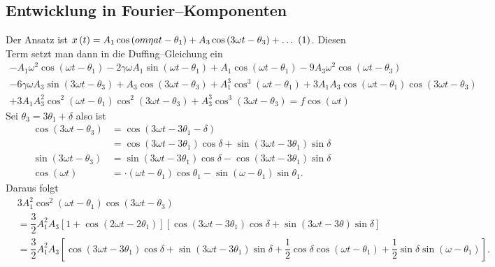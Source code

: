 \documentclass[a4paper,12pt]{article}
\newcommand\inlineeqno{\stepcounter{equation}\ {(\theequation)}}
\numberwithin{equation}{section}
\begin{document}
\subsection{Entwicklung in Fourier--Komponenten}
Der Ansatz ist $x\left(t\right)=A_1\cos \left(om\eta at-\theta _1\right)+A_3\cos \left(3\omega t-\theta _3\right)+\hdots \inlineeqno\label{eq:9.54}$. Diesen Term setzt man dann in die Duffing--Gleichung ein
\begin{multline*}
        -A_1\omega ^2\cos \left(\omega t-\theta _1\right)-2\gamma \omega A_1\sin \left(\omega t-\theta _1\right)+A_1\cos \left(\omega t-\theta _1\right)-9A_3\omega ^2\cos \left(\omega t-\theta _3\right)\\
        -6\gamma \omega A_3\sin \left(3\omega t-\theta _3\right)+A_3\cos \left(3\omega t-\theta _3\right)+A_1^3\cos ^3\left(\omega t-\theta _1\right)+3A_1A_3\cos \left(\omega t-\theta _1\right)\cos \left(3\omega t-\theta _3\right)\\
        +3A_1A_3^2\cos ^2\left(\omega t-\theta _1\right)\cos ^2\left(3\omega t-\theta _3\right)+A_3^3\cos ^3\left(3\omega t-\theta _3\right)=f\cos \left(\omega t\right)
\end{multline*}
Sei $\theta _3=3\theta _1+\delta $ also ist
\begin{align*} 
        \cos \left(3\omega t-\theta _3\right)&=\cos \left(3\omega t-3\theta _1-\delta \right)\\
                                             &=\cos \left(3\omega t-3\theta _1\right)\cos \delta +\sin \left(3\omega t-3\theta _1\right)\sin \delta \\
        \sin \left(3\omega t-\theta _3\right)&=\sin \left(3\omega t-3\theta _1\right)\cos \delta -\cos \left(3\omega t-3\theta _1\right)\sin \delta \\
        \cos \left(\omega t\right)&=\cdot \left(\omega t-\theta _1\right)\cos \theta _1-\sin \left(\omega -\theta _1\right)\sin \theta _1
.\end{align*} 
Daraus folgt
\begin{align*} 
        &3A_1^2\cos ^2\left(\omega t-\theta _1\right)\cos \left(3\omega t-\theta _3\right)\\
        &=\dfrac{3}{2}A_1^2A_3\left[1+\cos \left(2\omega t-2\theta _1\right)\right]\left[\cos \left(3\omega t-3\theta _1\right)\cos \delta +\sin \left(3\omega t-3\theta \right)\sin \delta \right]\\
        &=\dfrac{3}{2}A_1^2A_3\left[\cos \left(3\omega t-3\theta _1\right)\cos \delta +\sin \left(3\omega t-3\theta _1\right)\sin \delta +\dfrac{1}{2}\cos \delta \cos \left(\omega t-\theta _1\right)+\dfrac{1}{2}\sin \delta \sin \left(\omega -\theta _1\right)\right]
.\end{align*} 
\end{document}
